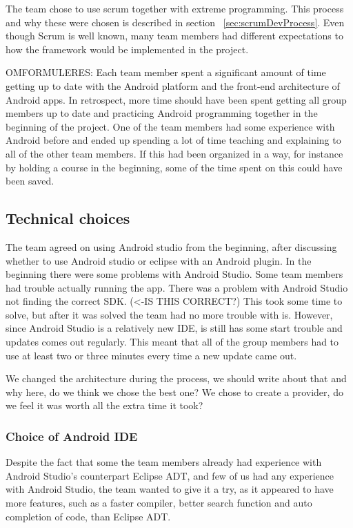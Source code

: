 The team chose to use scrum together with extreme programming. This process and why these were chosen is described in section ~\ref{sec:scrumDevProcess}. Even though Scrum is well known, many team members had different expectations to how the framework would be implemented in the project.


OMFORMULERES: Each team member spent a significant amount of time getting up to date with the Android platform and the front-end architecture of Android apps. In retrospect, more time should have been spent getting all group members up to date and practicing Android programming together in the beginning of the project. One of the team members had some experience with Android before and ended up spending a lot of time teaching and explaining to all of the other team members. If this had been organized in a way, for instance by holding a course in the beginning, some of the time spent on this could have been saved. 

\subsection{Technical choices}
The team agreed on using Android studio from the beginning, after discussing whether to use Android studio or eclipse with an Android plugin. In the beginning there were some problems with Android Studio. Some team members had trouble actually running the app. There was a problem with Android Studio not finding the correct SDK. (<-IS THIS CORRECT?) This took some time to solve, but after it was solved the team had no more trouble with is. However, since Android Studio is a relatively new IDE, is still has some start trouble and updates comes out regularly. This meant that all of the group members had to use at least two or three minutes every time a new update came out. 

We changed the architecture during the process, we should write about that and why here, do we think we chose the best one? We chose to create a provider, do we feel it was worth all the extra time it took? 

\subsubsection{Choice of Android IDE}
Despite the fact that some the team members already had experience with Android Studio's counterpart Eclipse ADT, and few of us had any experience with Android Studio, the team wanted to give it a try, as it appeared to have more features, such as a faster compiler, better search function and auto completion of code, than Eclipse ADT. 

